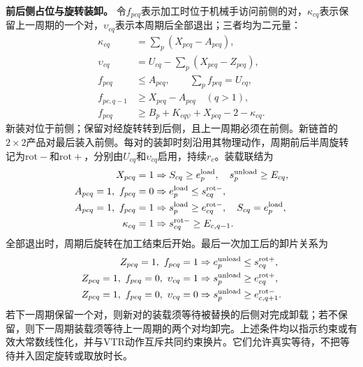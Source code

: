 \documentclass[final,5p,times,twocolumn]{elsarticle}
\begin{document}
\noindent\textbf{前后侧占位与旋转装卸。}
令$f_{pcq}$表示加工时位于机械手访问前侧的对，$\kappa_{cq}$表示保留上一周期的一个对，$\upsilon_{cq}$表示本周期后全部退出；三者均为二元量：
\begin{equation}
\begin{aligned}
\kappa_{cq}&=\sum_p(X_{pcq}-A_{pcq}),\\
\upsilon_{cq}&=U_{cq}-\sum_p(X_{pcq}-Z_{pcq}),\\
f_{pcq}&\le A_{pcq},\qquad\sum_pf_{pcq}=U_{cq},\\
f_{pc,q-1}&\ge X_{pcq}-A_{pcq}\quad(q>1),\\
f_{pcq}&\ge B_p+K_{cq\psi}+X_{pcq}-2-\kappa_{cq}.
\end{aligned}
\label{eq:cycle-side-cn}
\end{equation}
新装对位于前侧；保留对经旋转转到后侧，且上一周期必须在前侧。新链首的$2\times2$产品对最后装入前侧。每对的装卸时刻沿用其物理动作，周期前后半周旋转记为$\mathrm{rot-}$和$\mathrm{rot+}$，分别由$U_{cq}$和$\upsilon_{cq}$启用，持续$r_c$。装载联结为
\begin{equation}
\begin{aligned}
X_{pcq}=1&\Rightarrow S_{cq}\ge e^{\rm load}_p,\quad
s^{\rm unload}_p\ge E_{cq},\\
A_{pcq}=1,\ f_{pcq}=0&\Rightarrow e^{\rm load}_p\le s^{\rm rot-}_{cq},\\
A_{pcq}=1,\ f_{pcq}=1&\Rightarrow s^{\rm load}_p\ge e^{\rm rot-}_{cq},\quad
S_{cq}=e^{\rm load}_p,\\
\kappa_{cq}=1&\Rightarrow s^{\rm rot-}_{cq}\ge E_{c,q-1}.
\end{aligned}
\label{eq:cycle-load-cn}
\end{equation}
全部退出时，周期后旋转在加工结束后开始。最后一次加工后的卸片关系为
\begin{equation}
\begin{aligned}
Z_{pcq}=1,\ f_{pcq}=1&\Rightarrow e^{\rm unload}_p\le s^{\rm rot+}_{cq},\\
Z_{pcq}=1,\ f_{pcq}=0,\ \upsilon_{cq}=1
&\Rightarrow s^{\rm unload}_p\ge e^{\rm rot+}_{cq},\\
Z_{pcq}=1,\ f_{pcq}=0,\ \upsilon_{cq}=0
&\Rightarrow s^{\rm unload}_p\ge e^{\rm rot-}_{c,q+1}.
\end{aligned}
\label{eq:cycle-unload-cn}
\end{equation}
若下一周期保留一个对，则新对的装载须等待被替换的后侧对完成卸载；若不保留，则下一周期装载须等待上一周期的两个对均卸完。上述条件均以指示约束或有效大常数线性化，并与VTR动作互斥共同约束换片。它们允许真实等待，不把等待并入固定旋转或取放时长。
\end{document}
